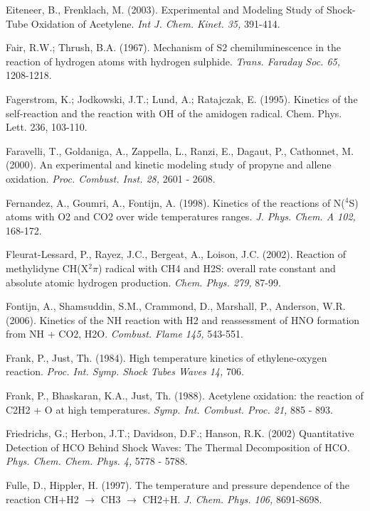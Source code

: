 \documentclass[12pt,landscape]{article}
\newcounter{reaction}
\begin{document}
Eiteneer, B., Frenklach, M. (2003).  Experimental and Modeling Study of Shock-Tube Oxidation of Acetylene. {\em Int J. Chem. Kinet. 35,} 391-414.

Fair, R.W.; Thrush, B.A. (1967).  Mechanism of S2 chemiluminescence in the reaction of hydrogen atoms with hydrogen sulphide. { \em Trans. Faraday Soc. 65,} 1208-1218.

Fagerstrom, K.; Jodkowski, J.T.; Lund, A.; Ratajczak, E. (1995). Kinetics of the self-reaction and the reaction with OH of the amidogen radical. Chem. Phys. Lett. 236, 103-110.

Faravelli, T., Goldaniga, A., Zappella, L., Ranzi, E., Dagaut, P., Cathonnet, M. (2000). An experimental and kinetic modeling study of propyne and allene oxidation. {\em Proc. Combust. Inst. 28,} 2601 - 2608.

Fernandez, A., Goumri, A., Fontijn, A. (1998). Kinetics of the reactions of N($^4$S) atoms with O2 and CO2 over wide temperatures ranges. {\em J. Phys. Chem. A 102,} 168-172.

Fleurat-Lessard, P., Rayez, J.C., Bergeat, A., Loison, J.C. (2002). Reaction of methylidyne CH(X$^2\pi$) radical with CH4 and H2S: overall rate constant and absolute atomic hydrogen production. {\em Chem. Phys. 279,} 87-99. %

Fontijn, A., Shamsuddin, S.M., Crammond, D., Marshall, P., Anderson, W.R. (2006).   Kinetics of the NH reaction with H2 and reassessment of HNO formation from NH + CO2, H2O. {\em Combust. Flame 145,} 543-551.

Frank, P., Just, Th. (1984). High temperature kinetics of ethylene-oxygen reaction. {\em  Proc. Int. Symp. Shock Tubes Waves 14,} 706.

Frank, P., Bhaskaran, K.A., Just, Th. (1988). Acetylene oxidation: the reaction of C2H2 + O at high temperatures.  {\em Symp. Int. Combust. Proc. 21,} 885 - 893.

 Friedrichs, G.; Herbon, J.T.; Davidson, D.F.; Hanson, R.K. (2002)   Quantitative Detection of HCO Behind Shock Waves: The Thermal Decomposition of HCO.  {\em Phys. Chem. Chem. Phys. 4,} 5778 - 5788.

Fulle, D., Hippler, H. (1997).  The temperature and pressure dependence of the reaction CH+H2 $\rightarrow$ CH3 $\rightarrow$ CH2+H.  {\em J. Chem. Phys. 106,} 8691-8698.
\end{document}
